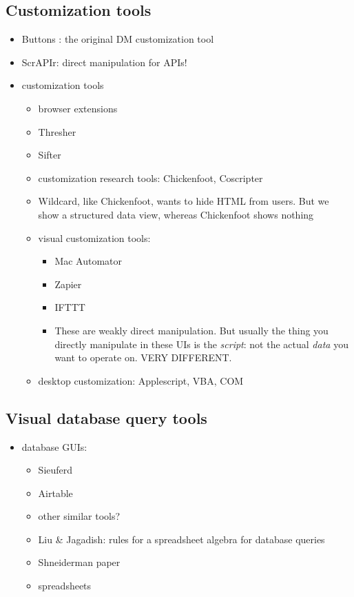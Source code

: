 \documentclass[sigplan,10pt,anonymous,review]{acmart}
\providecommand{\tightlist}{%
  \setlength{\itemsep}{0pt}\setlength{\parskip}{0pt}}
\begin{document}
\hypertarget{customization-tools}{%
\subsection{Customization tools}\label{customization-tools}}

\begin{itemize}
\item
  Buttons \citep{maclean1990}: the original DM customization tool
\item
  ScrAPIr: direct manipulation for APIs!
\item
  customization tools

  \begin{itemize}
  \item
    browser extensions
  \item
    Thresher
  \item
    Sifter
  \item
    customization research tools: Chickenfoot, Coscripter
  \item
    Wildcard, like Chickenfoot, wants to hide HTML from users. But we
    show a structured data view, whereas Chickenfoot shows nothing
  \item
    visual customization tools:

    \begin{itemize}
    \tightlist
    \item
      Mac Automator
    \item
      Zapier
    \item
      IFTTT
    \item
      These are weakly direct manipulation. But usually the thing you
      directly manipulate in these UIs is the \emph{script}: not the
      actual \emph{data} you want to operate on. VERY DIFFERENT.
    \end{itemize}
  \item
    desktop customization: Applescript, VBA, COM
  \end{itemize}
\end{itemize}

\hypertarget{visual-database-query-tools}{%
\subsection{Visual database query
tools}\label{visual-database-query-tools}}

\begin{itemize}
\tightlist
\item
  database GUIs:

  \begin{itemize}
  \tightlist
  \item
    Sieuferd \citep{bakke2016}
  \item
    Airtable \citep{2020a}
  \item
    other similar tools?
  \item
    Liu \& Jagadish: rules for a spreadsheet algebra for database
    queries \citep{liu2009}
  \item
    Shneiderman paper
  \item
    spreadsheets
  \end{itemize}
\end{itemize}
\end{document}
